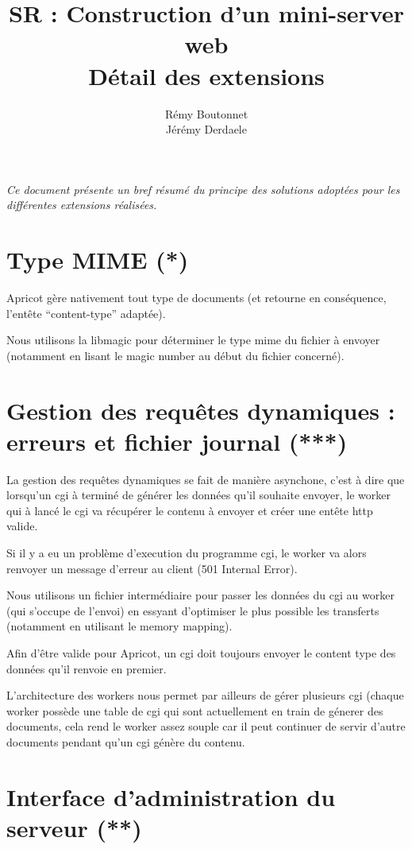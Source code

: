 \documentclass{article}
\title{SR : Construction d'un mini-server web\\Détail des extensions}
\author{Rémy Boutonnet\\Jérémy Derdaele}
\begin{document}
\maketitle


\textit{
Ce document présente un bref résumé du principe des solutions adoptées pour les différentes extensions réalisées.
}

\section{Type MIME (*)}
Apricot gère nativement tout type de documents (et retourne en conséquence, l'entête ``content-type'' adaptée).

Nous utilisons la libmagic pour déterminer le type mime du fichier à envoyer (notamment en lisant le magic number au début du fichier concerné).


\section{Gestion des requêtes dynamiques : erreurs et fichier journal (***)}

La gestion des requêtes dynamiques se fait de manière asynchone, c'est à dire que lorsqu'un cgi à terminé de générer les données qu'il souhaite envoyer, le worker qui à lancé le cgi va récupérer le contenu à envoyer et créer une entête http valide.

Si il y a eu un problème d'execution du programme cgi, le worker va alors renvoyer un message d'erreur au client (501 Internal Error).

Nous utilisons un fichier intermédiaire pour passer les données du cgi au worker (qui s'occupe de l'envoi) en essyant d'optimiser le plus possible les transferts (notamment en utilisant le memory mapping).

Afin d'être valide pour Apricot, un cgi doit toujours envoyer le content type des données qu'il renvoie en premier.

L'architecture des workers nous permet par ailleurs de gérer plusieurs cgi (chaque worker possède une table de cgi qui sont actuellement en train de génerer des documents,
cela rend le worker assez souple car il peut continuer de servir d'autre documents pendant qu'un cgi génère du contenu.

\section{Interface d'administration du serveur (**)}
\end{document}
